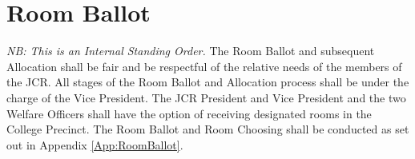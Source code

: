 \chapter{Room Ballot} \label{ch:RoomBallot}
\textit{NB: This is an Internal Standing Order.}
\npara The Room Ballot and subsequent Allocation shall be fair and be respectful of the relative needs of the members of the JCR.
\npara All stages of the Room Ballot and Allocation process shall be under the charge of the Vice President.
\npara The JCR President and Vice President and the two Welfare Officers shall have the option of receiving designated rooms in the College Precinct.
\npara The Room Ballot and Room Choosing shall be conducted as set out in Appendix \ref{App:RoomBallot}.
